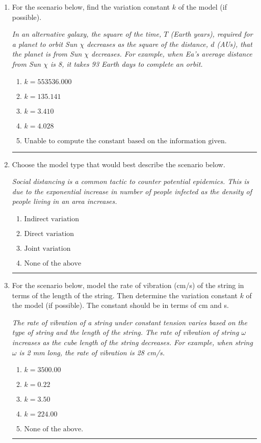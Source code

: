 \documentclass[14pt]{extbook}
\newcommand{\litem}[1]{\item#1\hspace*{-1cm}\rule{\textwidth}{0.4pt}}
\begin{document}
\begin{enumerate}
{\begin{enumerate}[label=\Alph*.]
\end{enumerate} }
\litem{
For the scenario below, find the variation constant $k$ of the model (if possible).
\begin{center}
    \textit{ In an alternative galaxy, the square of the time, $T$ (Earth years), required for a planet to orbit Sun $\chi$ decreases as the square of the distance, $d$ (AUs), that the planet is from Sun $\chi$ decreases. For example, when Ea's average distance from Sun $\chi$ is 8, it takes 93 Earth days to complete an orbit. }
\end{center}
\begin{enumerate}[label=\Alph*.]
\item \( k = 553536.000 \)
\item \( k = 135.141 \)
\item \( k = 3.410 \)
\item \( k = 4.028 \)
\item \( \text{Unable to compute the constant based on the information given.} \)

\end{enumerate} }
\litem{
Choose the model type that would best describe the scenario below.
\begin{center}
    \textit{ Social distancing is a common tactic to counter potential epidemics. This is due to the exponential increase in number of people infected as the density of people living in an area increases. }
\end{center}
\begin{enumerate}[label=\Alph*.]
\item \( \text{Indirect variation} \)
\item \( \text{Direct variation} \)
\item \( \text{Joint variation} \)
\item \( \text{None of the above} \)

\end{enumerate} }
\litem{
For the scenario below, model the rate of vibration (cm/s) of the string in terms of the length of the string. Then determine the variation constant $k$ of the model (if possible). The constant should be in terms of cm and s.
\begin{center}
    \textit{ The rate of vibration of a string under constant tension varies based on the type of string and the length of the string. The rate of vibration of string $\omega$ increases as the cube length of the string decreases. For example, when string $\omega$ is 2 mm long, the rate of vibration is 28 cm/s. }
\end{center}
\begin{enumerate}[label=\Alph*.]
\item \( k = 3500.00 \)
\item \( k = 0.22 \)
\item \( k = 3.50 \)
\item \( k = 224.00 \)
\item \( \text{None of the above.} \)


\end{enumerate}}
\end{enumerate}
\end{document}
